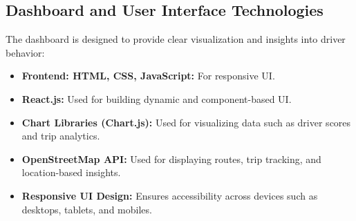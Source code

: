 \subsection{Dashboard and User Interface Technologies}
The dashboard is designed to provide clear visualization and insights into driver behavior:
\begin{itemize}
    \item \textbf{Frontend: HTML, CSS, JavaScript:} For responsive UI.
    \item \textbf{React.js:} Used for building dynamic and component-based UI.
    \item \textbf{Chart Libraries (Chart.js):} Used for visualizing data such as driver scores and trip analytics.
    \item \textbf{OpenStreetMap API:} Used for displaying routes, trip tracking, and location-based insights.
    \item \textbf{Responsive UI Design:} Ensures accessibility across devices such as desktops, tablets, and mobiles.
\end{itemize}
